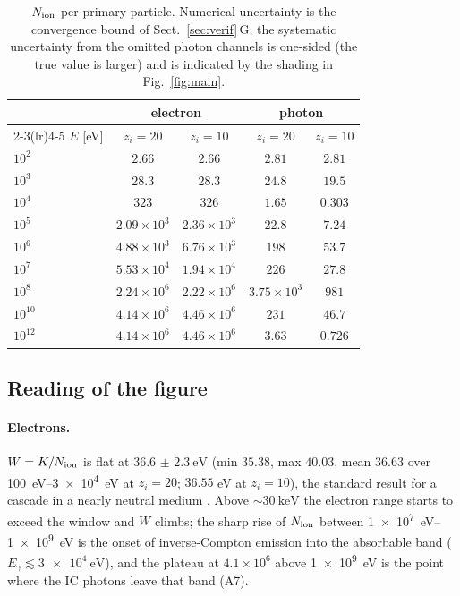 \documentclass[11pt,a4paper]{article}
\begin{document}
\begin{table}[htbp]
\centering
\caption{$N_{\rm ion}$ per primary particle. Numerical uncertainty is the
convergence bound of Sect.~\ref{sec:verif}\,G; the systematic uncertainty
from the omitted photon channels is one-sided (the true value is larger) and
is indicated by the shading in Fig.~\ref{fig:main}.}
\label{tab:main}
\begin{tabular}{lcccc}
\toprule
& \multicolumn{2}{c}{electron} & \multicolumn{2}{c}{photon} \\
\cmidrule(lr){2-3}\cmidrule(lr){4-5}
$E$ [eV] & $z_i=20$ & $z_i=10$ & $z_i=20$ & $z_i=10$ \\
\midrule
$10^{2}$  & $2.66$              & $2.66$              & $2.81$              & $2.81$ \\
$10^{3}$  & $28.3$              & $28.3$              & $24.8$              & $19.5$ \\
$10^{4}$  & $323$               & $326$               & $1.65$              & $0.303$ \\
$10^{5}$  & $2.09\times10^{3}$  & $2.36\times10^{3}$  & $22.8$              & $7.24$ \\
$10^{6}$  & $4.88\times10^{3}$  & $6.76\times10^{3}$  & $198$               & $53.7$ \\
$10^{7}$  & $5.53\times10^{4}$  & $1.94\times10^{4}$  & $226$               & $27.8$ \\
$10^{8}$  & $2.24\times10^{6}$  & $2.22\times10^{6}$  & $3.75\times10^{3}$  & $981$ \\
$10^{10}$ & $4.14\times10^{6}$  & $4.46\times10^{6}$  & $231$               & $46.7$ \\
$10^{12}$ & $4.14\times10^{6}$  & $4.46\times10^{6}$  & $3.63$              & $0.726$ \\
\bottomrule
\end{tabular}
\end{table}

\subsection*{Reading of the figure}

\paragraph{Electrons.}
$W = K/N_{\rm ion}$ is flat at
$\SI{36.6(23)}{\electronvolt}$ (min $35.38$, max $40.03$, mean $36.63$ over
\SIrange{100}{3e4}{\electronvolt} at $z_i=20$; $36.55$ eV at $z_i=10$), the
standard result for a cascade in a nearly neutral medium
\citep{shull85,furlanetto10}. Above $\sim\SI{30}{\kilo\electronvolt}$ the
electron range starts to exceed the window and $W$ climbs; the sharp rise of
$N_{\rm ion}$ between \SIrange{1e7}{1e9}{\electronvolt} is the onset of
inverse-Compton emission into the absorbable band ($E_\gamma\lesssim
\SI{3e4}{\electronvolt}$), and the plateau at $4.1\times10^{6}$ above
\SI{1e9}{\electronvolt} is the point where the IC photons leave that band
(A7).
\end{document}
